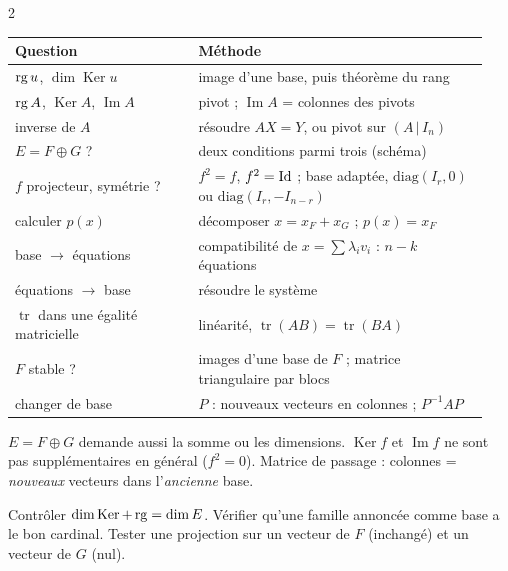 \documentclass[a4paper,10pt]{article}
\newcommand{\sous}[1]{\par\needspace{6\baselineskip}\vspace{0.25em}\noindent{\sffamily\bfseries\small\color{BleuMoyen}#1}\par\nobreak}
\newcommand{\Ker}{\operatorname{Ker}}\renewcommand{\Im}{\operatorname{Im}}\newcommand{\tr}{\operatorname{tr}}\newcommand{\Sp}{\operatorname{Sp}}
\begin{document}
\begin{multicols}{2}
\sous{Je vois\dots\ je fais\dots}
{\small\renewcommand{\arraystretch}{1.16}
\begin{tabular}{@{}>{\raggedright\arraybackslash}p{0.36\linewidth}>{\raggedright\arraybackslash}p{0.58\linewidth}@{}}
\toprule
\textsf{\scriptsize Question} & \textsf{\scriptsize Méthode}\\\midrule
$\operatorname{rg} u$, $\dim\Ker u$ & image d'une base, puis théorème du rang\\
$\operatorname{rg} A$, $\Ker A$, $\Im A$ & pivot ; $\Im A$ = colonnes des pivots\\
inverse de $A$ & résoudre $AX=Y$, ou pivot sur $(A\,|\,I_n)$\\
$E=F\oplus G$ ? & deux conditions parmi trois (schéma)\\
$f$ projecteur, symétrie ? & $f^2=f$, $f^2=\operatorname{Id}$ ; base adaptée, $\mathrm{diag}(I_r,0)$ ou $\mathrm{diag}(I_r,-I_{n-r})$\\
calculer $p(x)$ & décomposer $x=x_F+x_G$ ; $p(x)=x_F$\\
base $\to$ équations & compatibilité de $x=\sum\lambda_iv_i$ : $n-k$ équations\\
équations $\to$ base & résoudre le système\\
$\tr$ dans une égalité matricielle & linéarité, $\tr(AB)=\tr(BA)$\\
$F$ stable ? & images d'une base de $F$ ; matrice triangulaire par blocs\\
changer de base & $P$ : nouveaux vecteurs en colonnes ; $P^{-1}AP$\\
\bottomrule
\end{tabular}}

\begin{PIEGE}
$E=F\oplus G$ demande aussi la somme ou les dimensions. $\Ker f$ et $\Im f$ ne sont pas supplémentaires en général
($f^2=0$). Matrice de passage : colonnes = \emph{nouveaux} vecteurs dans l'\emph{ancienne} base.
\end{PIEGE}

\begin{REFL}
Contrôler $\dim\Ker+\rg=\dim E$. Vérifier qu'une famille annoncée comme base a le bon cardinal. Tester une projection
sur un vecteur de $F$ (inchangé) et un vecteur de $G$ (nul).
\end{REFL}

\end{multicols}
\end{document}
